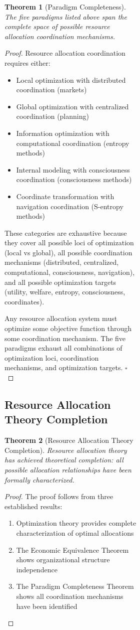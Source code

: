 \documentclass[12pt,a4paper]{article}
\newtheorem{theorem}{Theorem}
\begin{document}
\begin{figure}[H]
\begin{figure}[H]
\begin{figure}[H]
\begin{theorem}[Paradigm Completeness]
The five paradigms listed above span the complete space of possible resource allocation coordination mechanisms.
\end{theorem}

\begin{proof}
Resource allocation coordination requires either:
\begin{itemize}
\item Local optimization with distributed coordination (markets)
\item Global optimization with centralized coordination (planning)
\item Information optimization with computational coordination (entropy methods)
\item Internal modeling with consciousness coordination (consciousness methods)
\item Coordinate transformation with navigation coordination (S-entropy methods)
\end{itemize}

These categories are exhaustive because they cover all possible loci of optimization (local vs global), all possible coordination mechanisms (distributed, centralized, computational, consciousness, navigation), and all possible optimization targets (utility, welfare, entropy, consciousness, coordinates).

Any resource allocation system must optimize some objective function through some coordination mechanism. The five paradigms exhaust all combinations of optimization loci, coordination mechanisms, and optimization targets. $\square$
\end{proof}

\subsection{Resource Allocation Theory Completion}

\begin{theorem}[Resource Allocation Theory Completion]
Resource allocation theory has achieved theoretical completion: all possible allocation relationships have been formally characterized.
\end{theorem}

\begin{proof}
The proof follows from three established results:
\begin{enumerate}
\item Optimization theory provides complete characterization of optimal allocations
\item The Economic Equivalence Theorem shows organizational structure independence
\item The Paradigm Completeness Theorem shows all coordination mechanisms have been identified
\end{enumerate}


\end{proof}
\end{figure}
\end{figure}
\end{figure}
\end{document}
